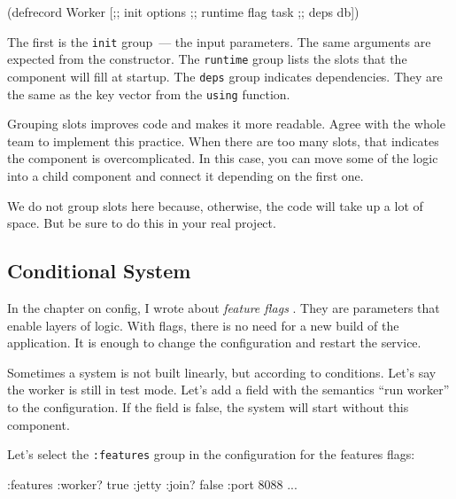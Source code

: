 \begin{english}
  \begin{clojure}
(defrecord Worker
    [;; init
     options
     ;; runtime
     flag
     task
     ;; deps
     db])
  \end{clojure}
\end{english}

The first is the \verb|init| group~--- the input parameters. The same arguments are expected from the constructor. The \verb|runtime| group lists the slots that the component will fill at startup. The \verb|deps| group indicates dependencies. They are the same as the key vector from the \verb|using| function.

Grouping slots improves code and makes it more readable. Agree with the whole team to implement this practice. When there are too many slots, that indicates the component is overcomplicated. In this case, you can move some of the logic into a child component and connect it depending on the first one.

We do not group slots here because, otherwise, the code will take up a lot of space. But be sure to do this in your real project.

\subsection{Conditional System}


In the chapter on config, I wrote about \emph{feature flags} . They are parameters that enable layers of logic. With flags, there is no need for a new build of the application. It is enough to change the configuration and restart the service.

Sometimes a system is not built linearly, but according to conditions. Let's say the worker is still in test mode. Let's add a field with the semantics ``run worker'' to the configuration. If the field is false, the system will start without this component.


Let's select the \verb|:features| group in the configuration for the features flags:

\begin{english}
  \begin{clojure}
{:features {:worker? true}
 :jetty {:join? false :port 8088}
 ...}
  \end{clojure}
\end{english}

